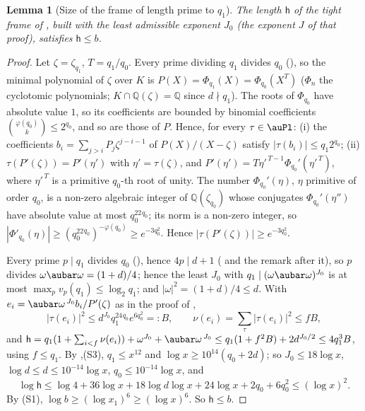\documentclass[10pt]{amsart}
\newtheorem{lemma}[theorem]{Lemma}
\theoremstyle{definition}
\theoremstyle{remark}
\newcommand{\Q}{\mathbb Q}
\begin{document}
\begin{lemma}[Size of the frame of length prime to $q_1$]\label{pst:hsize}
The length $\mathsf h$ of the tight frame of {\cite[Lemma~7.11]{P49}}, built with the least admissible
exponent $J_0$ (the exponent $J$ of that proof), satisfies $\mathsf h\le b$.
\end{lemma}
\begin{proof}
Let $\zeta=\zeta_{q_1}$, $T=q_1/q_0$. Every prime dividing $q_1$ divides $q_0$
({\cite[Lemma~13.4(S7)]{P46}}), so the minimal polynomial of $\zeta$ over $K$ is
$P(X)=\Phi_{q_1}(X)=\Phi_{q_0}(X^{T})$ ($\Phi_n$ the cyclotomic polynomials; $K\cap\Q(\zeta)=\Q$
since $d\nmid q_1$). The roots of $\Phi_{q_0}$ have absolute value $1$, so its coefficients are
bounded by binomial coefficients $\binom{\varphi(q_0)}{k}\le2^{q_0}$, and so are those of $P$.
Hence, for every $\tau\in\auPl$: (i) the coefficients $b_i=\sum_{j>i}P_j\zeta^{j-i-1}$ of
$P(X)/(X-\zeta)$ satisfy $|\tau(b_i)|\le q_1 2^{q_0}$; (ii) $\tau(P'(\zeta))=P'(\eta')$ with
$\eta'=\tau(\zeta)$, and $P'(\eta')=T\eta'^{\,T-1}\Phi_{q_0}'(\eta'^{\,T})$, where $\eta'^{\,T}$ is
a primitive $q_0$-th root of unity. The number $\Phi_{q_0}'(\eta)$, $\eta$ primitive of order $q_0$, is
a non-zero algebraic integer of $\Q(\zeta_{q_0})$ whose conjugates $\Phi_{q_0}'(\eta'')$ have absolute
value at most $q_0^22^{q_0}$; its norm is a non-zero integer, so $|\Phi'_{q_0}(\eta)|\ge(q_0^22^{q_0}
)^{-\varphi(q_0)}\ge e^{-3q_0^2}$. Hence $|\tau(P'(\zeta))|\ge e^{-3q_0^2}$.

Every prime $p\mid q_1$ divides $q_0$ ({\cite[Lemma~13.4(S7)]{P46}}), hence $4p\mid d+1$ ({\cite[Definition~13.1]{P46}} and the remark after it), so $p$ divides $\omega\aubar\omega=(1+d)/4$; hence the least $J_0$ with $q_1\mid(\omega
\aubar\omega)^{J_0}$ is at most $\max_pv_p(q_1)\le\log_2q_1$; and $|\omega|^2=(1+d)/4\le d$. With
$e_i=\aubar\omega^{\,J_0}b_i/P'(\zeta)$ as in the proof of {\cite[Lemma~7.11]{P49}},
\[
|\tau(e_i)|^2\le d^{J_0}q_1^24^{q_0}e^{6q_0^2}=:B,\qquad\nu(e_i)=\sum_\tau|\tau(e_i)|^2\le fB,
\]
and $\mathsf h=q_1(1+\sum_{i<f}\nu(e_i))+\omega^{J_0}+\aubar\omega^{\,J_0}\le q_1(1+f^2B)+2d^{J_0/2}\le
4q_1^3B$, using $f\le q_1$. By {\cite[Lemma~13.4(S1)]{P46}},(S3), $q_1\le x^{12}$ and $\log x\ge
10^{14}(q_0+2d)$; so $J_0\le18\log x$, $\log d\le d\le10^{-14}\log x$, $q_0\le10^{-14}\log x$, and
\[
\log\mathsf h\le\log4+36\log x+18\log d\log x+24\log x+2q_0+6q_0^2\le(\log x)^2 .
\]
By (S1), $\log b\ge(\log x_1)^6\ge(\log x)^6$. So $\mathsf h\le b$.
\end{proof}
\end{document}
